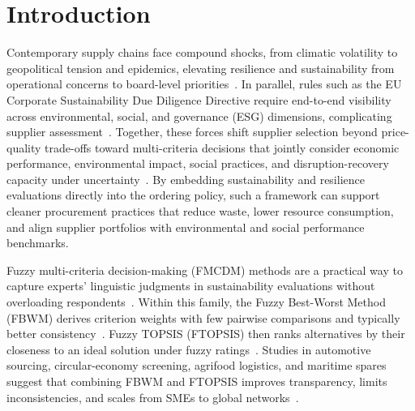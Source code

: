\documentclass[preprint,12pt]{elsarticle}
\begin{document}
\begin{frontmatter}
    
\end{frontmatter}

\section{Introduction}
\label{sec:Intro}
Contemporary supply chains face compound shocks, from climatic volatility to geopolitical tension and epidemics, elevating resilience and sustainability from operational concerns to board-level priorities~\citep{Ivanov_Dolgui_2021,Li_etal_2024}. In parallel, rules such as the EU Corporate Sustainability Due Diligence Directive require end-to-end visibility across environmental, social, and governance (ESG) dimensions, complicating supplier assessment~\citep{European_Commission_2023}. Together, these forces shift supplier selection beyond price-quality trade-offs toward multi-criteria decisions that jointly consider economic performance, environmental impact, social practices, and disruption-recovery capacity under uncertainty~\citep{Dubey_etal_2021}.
By embedding sustainability and resilience evaluations directly into the ordering policy, such a framework can support cleaner procurement practices that reduce waste, lower resource consumption, and align supplier portfolios with environmental and social performance benchmarks.

Fuzzy multi-criteria decision-making (FMCDM) methods are a practical way to capture experts' linguistic judgments in sustainability evaluations without overloading respondents~\citep{Celik_Kahraman_2021,Jalali_etal_2022}. Within this family, the Fuzzy Best-Worst Method (FBWM) derives criterion weights with few pairwise comparisons and typically better consistency~\citep{Celik_Kahraman_2021}. Fuzzy TOPSIS (FTOPSIS) then ranks alternatives by their closeness to an ideal solution under fuzzy ratings~\citep{Jalali_etal_2022}. Studies in automotive sourcing, circular-economy screening, agrifood logistics, and maritime spares suggest that combining FBWM and FTOPSIS improves transparency, limits inconsistencies, and scales from SMEs to global networks~\citep{Afrasiabi_Tavana_DiCaprio_2022,El_Bettioui_Zaim_Sbihi_2023,Varchandi_Memari_AkbariJokar_2024}.
\end{document}
